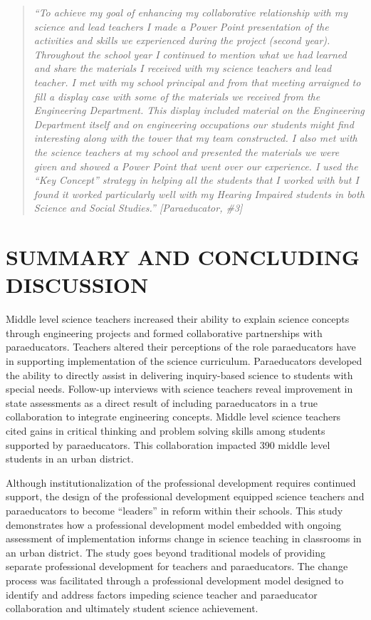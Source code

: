 \documentclass[11.5pt]{sig-alternate} %
\begin{document}
\begin{large}
\begin{quote}
    \textit{“To achieve my goal of enhancing my collaborative relationship with my science and lead teachers I made a Power Point presentation of the activities and skills we experienced during the project (second year). Throughout the school year I continued to mention what we had learned and share the materials I received with my science teachers and lead teacher. I met with my school principal and from that meeting arraigned to fill a display case with some of the materials we received from the Engineering Department. This display included material on the Engineering Department itself and on engineering occupations our students might find interesting along with the tower that my team constructed. I also met with the science teachers at my school and presented the materials we were given and showed a Power Point that went over our experience. I used the “Key Concept” strategy in helping all the students that I worked with but I found it worked particularly well with my Hearing Impaired students in both Science and Social Studies.” [Paraeducator, \#3]}
\end{quote}

\section*{SUMMARY AND CONCLUDING DISCUSSION}

Middle level science teachers increased their ability to explain science concepts through engineering projects and formed collaborative partnerships with paraeducators. Teachers altered their perceptions of the role paraeducators have in supporting implementation of the science curriculum. Paraeducators developed the ability to directly assist in delivering inquiry-based science to students with special needs. Follow-up interviews with science teachers reveal improvement in state assessments as a direct result of including paraeducators in a true collaboration to integrate engineering concepts. Middle level science teachers cited gains in critical thinking and problem solving skills among students supported by paraeducators. This collaboration impacted 390 middle level students in an urban district. 

Although institutionalization of the professional development requires continued support, the design of the professional development equipped science teachers and paraeducators to become “leaders” in reform within their schools. This study demonstrates how a professional development model embedded with ongoing assessment of implementation informs change in science teaching in classrooms in an urban district. The study goes beyond traditional models of providing separate professional development for teachers and paraeducators. The change process was facilitated through a professional development model designed to identify and address factors impeding science teacher and paraeducator collaboration and ultimately student science achievement. 


\end{large}
\end{document}
